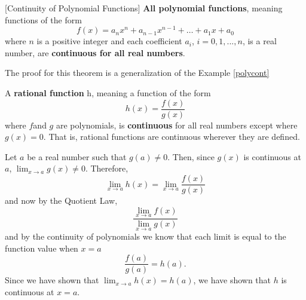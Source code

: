 \documentclass{ximera}
\begin{document}
\begin{theorem}\label{polycont}[Continuity of Polynomial Functions]
 \textbf{All polynomial functions}, meaning functions of the form
  \[
  f(x) = a_nx^n + a_{n-1}x^{n-1} + \dots + a_1 x + a_0
  \]
  where $n$ is a positive integer  and each coefficient $a_i$, $i=0, 1,...,n$, is a real number, are
  \textbf{continuous for all real numbers}.

The proof for this theorem is a generalization of the Example \ref{polycont}

\end{theorem}

\begin{theorem}
   A \textbf{rational function} h, meaning a function of the form 
  \[
  h(x)=\frac{f(x)}{g(x)}
  \]
  where $f $and $g$ are polynomials, is \textbf{continuous} for all real numbers except where $g(x)=0$.  That is,
  rational functions are continuous wherever they are defined.
\begin{explanation}
      Let $a$ be a real number such that $g(a)\neq 0$.  Then, since
      $g(x)$ is continuous at $a$, $\lim_{x\to a} g(x) \neq 0$.
      Therefore, 
      \[
      \lim_{x \to a} h(x) = \lim_{x\to a} \frac{f(x)}{g(x)}
      \]
      and now by the Quotient Law, 
      \[
      \frac{\lim_{x\to a} f(x)}{ \lim_{x\to a} g(x)}
      \]
      and by the continuity of polynomials we know that each limit is equal to the function value when $x=a$
      \[
      \frac{f(a)}{g(a)}=h(a).
      \]
      Since we have shown that $\lim_{x\to a} h(x) = h(a)$, we have
      shown that $h$ is continuous at $x=a$.
\end{explanation}
\end{theorem}
\end{document}
